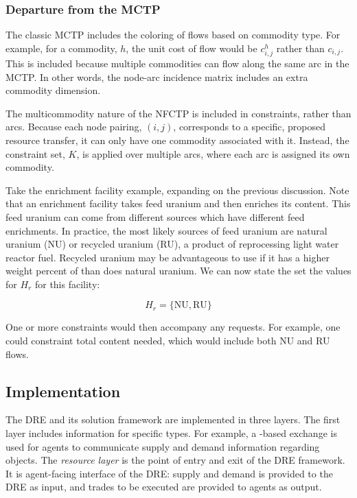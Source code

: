 \subsubsection{Departure from the MCTP}

The classic MCTP includes the coloring of flows based on commodity type. For
example, for a commodity, $h$, the unit cost of flow would be $c^h_{i,j}$ rather
than $c_{i, j}$. This is included because multiple commodities can flow along
the same arc in the MCTP. In other words, the node-arc incidence matrix includes
an extra commodity dimension. 

The multicommodity nature of the NFCTP is included in constraints, rather than
arcs. Because each node pairing, $(i, j)$, corresponds to a specific, proposed
resource transfer, it can only have one commodity associated with it. Instead,
the constraint set, $K$, is applied over multiple arcs, where each arc is
assigned its own commodity. 

Take the enrichment facility example, expanding on the previous discussion. Note
that an enrichment facility takes feed uranium and then enriches its
 content. This feed uranium can come from different sources which
have different feed enrichments. In practice, the most likely sources of feed
uranium are natural uranium (NU) or recycled uranium (RU), a product of
reprocessing light water reactor fuel. Recycled uranium may be advantageous to
use if it has a higher weight percent of  than does natural
uranium. We can now state the set the values for $H_{r}$ for this facility:

\begin{equation}\label{eqs:enr-dem-commods}
  H_{r} = \{ \mbox{NU}, \mbox{RU} \}
\end{equation}

One or more constraints would then accompany any requests. For example, one
could constraint total  content needed, which would include both NU
and RU flows.

\subsection{Implementation}\label{abm:dre:impl}

The DRE and its solution framework are implemented in three layers. The first
layer includes information for specific  types. For example, a
-based exchange is used for agents to communicate supply and
demand information regarding  objects. The \textit{resource
  layer} is the point of entry and exit of the DRE framework. It is agent-facing
interface of the DRE: supply and demand is provided to the DRE as input, and
trades to be executed are provided to agents as output. 

